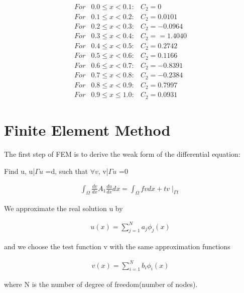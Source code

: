 \documentclass[paper=a4, fontsize=11pt]{article} %
\begin{document}
\begin{eqnarray}
For & 0.0 \leq x < 0.1 :& C_2 = 0 \nonumber\\
For & 0.1 \leq x < 0.2 :& C_2 = 0.0101\nonumber\\
For & 0.2 \leq x < 0.3 :& C_2 = -0.0964 \nonumber\\
For & 0.3 \leq x < 0.4 :& C_2 = =1.4040 \nonumber\\
For & 0.4 \leq x < 0.5 :& C_2 = 0.2742 \nonumber\\
For & 0.5 \leq x < 0.6 :& C_2 = 0.1166 \nonumber\\
For & 0.6 \leq x < 0.7 :& C_2 = -0.8391 \nonumber\\
For & 0.7 \leq x < 0.8 :& C_2 = -0.2384 \nonumber\\
For & 0.8 \leq x < 0.9 :& C_2 = 0.7997\nonumber\\
For & 0.9 \leq x \leq 1.0 :& C_2 = 0.0931
\end{eqnarray}

\section{Finite Element Method}
The first step of FEM is to derive the weak form of the differential equation:

Find u, u|$\Gamma u$ =d, such that $\forall v$, v|$\Gamma u$ =0

\begin{eqnarray}
\int_{\Omega} \frac{dv}{dx} A_1 \frac{du}{dx} dx = \int_{\Omega} fv dx + tv \mid _{\Gamma t}
\end{eqnarray}


We approximate the real solution u by

\begin{eqnarray}
u(x) = \sum_{j=1}^{N} a_j \phi_j(x)
\end{eqnarray}

and we choose the test function v with the same approximation functions

\begin{eqnarray}
v(x) = \sum_{i=1}^{N} b_i \phi_i(x)
\end{eqnarray}

where N is the number of degree of freedom(number of nodes). 
\end{document}
